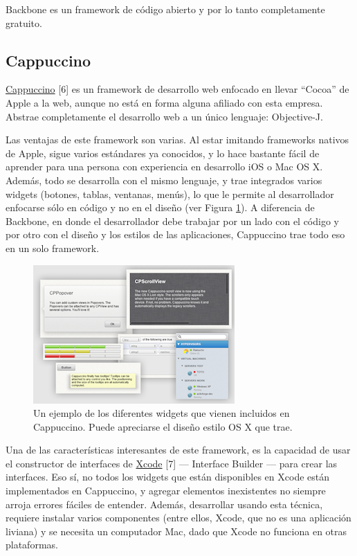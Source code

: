 \documentclass[12pt,spanish,letter]{report}
\makeatletter
\def\maxwidth{\ifdim\Gin@nat@width>\linewidth\linewidth
\else\Gin@nat@width\fi}
\let\Oldincludegraphics\includegraphics
\renewcommand{\includegraphics}[1]{\Oldincludegraphics[width=\maxwidth]{#1}}
\makeatother
\begin{document}
Backbone es un framework de código abierto y por lo tanto completamente
gratuito.

\subsection{Cappuccino}

\href{http://cappuccino-project.org}{Cappuccino} {[}6{]} es un framework
de desarrollo web enfocado en llevar ``Cocoa'' de Apple a la web, aunque
no está en forma alguna afiliado con esta empresa. Abstrae completamente
el desarrollo web a un único lenguaje: Objective-J.

Las ventajas de este framework son varias. Al estar imitando frameworks
nativos de Apple, sigue varios estándares ya conocidos, y lo hace
bastante fácil de aprender para una persona con experiencia en
desarrollo iOS o Mac OS X. Además, todo se desarrolla con el mismo
lenguaje, y trae integrados varios widgets (botones, tablas, ventanas,
menús), lo que le permite al desarrollador enfocarse sólo en código y no
en el diseño (ver Figura \ref{figure:cappuccino}). A diferencia de
Backbone, en donde el desarrollador debe trabajar por un lado con el
código y por otro con el diseño y los estilos de las aplicaciones,
Cappuccino trae todo eso en un solo framework.

\begin{figure}[htbp]
\centering
\includegraphics{figures/cappuccino-widgets.png}
\caption{Un ejemplo de los diferentes widgets que vienen incluidos en
Cappuccino. Puede apreciarse el diseño estilo OS X que trae.
\label{figure:cappuccino}}
\end{figure}

Una de las características interesantes de este framework, es la
capacidad de usar el constructor de interfaces de
\href{https://developer.apple.com/xcode/}{Xcode} {[}7{]} --- Interface
Builder --- para crear las interfaces. Eso sí, no todos los widgets que
están disponibles en Xcode están implementados en Cappuccino, y agregar
elementos inexistentes no siempre arroja errores fáciles de entender.
Además, desarrollar usando esta técnica, requiere instalar varios
componentes (entre ellos, Xcode, que no es una aplicación liviana) y se
necesita un computador Mac, dado que Xcode no funciona en otras
plataformas.
\end{document}
